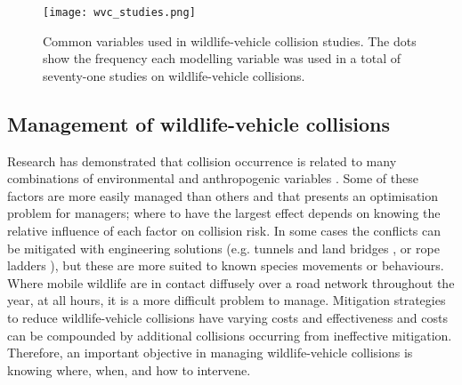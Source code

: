 \begin{figure*}[!t]
  \centering
  \texttt{[image: wvc\_studies.png]}
  \caption[Variables used in wildlife-vehicle collision studies]{Common variables used in wildlife-vehicle collision studies. The dots show the frequency each modelling variable was used in a total of seventy-one studies on wildlife-vehicle collisions.}
  \label{wvc_studies}
\end{figure*}

\subsection{Management of wildlife-vehicle collisions}


Research has demonstrated that collision occurrence is related to many combinations of environmental and anthropogenic variables \citep{barn07}. Some of these factors are more easily managed than others and that presents an optimisation problem for managers; where to have the largest effect depends on knowing the relative influence of each factor on collision risk. In some cases the conflicts can be mitigated with engineering solutions (e.g. tunnels and land bridges \citep{bond08}, or rope ladders \citep{soan13}), but these are more suited to known species movements or behaviours. Where mobile wildlife are in contact diffusely over a road network throughout the year, at all hours, it is a more difficult problem to manage.  Mitigation strategies to reduce wildlife-vehicle collisions have varying costs and effectiveness \citep{huij09} and costs can be compounded by additional collisions occurring from ineffective mitigation. Therefore, an important objective in managing wildlife-vehicle collisions is knowing where, when, and how to intervene.

